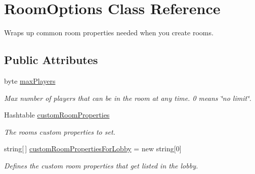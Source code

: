 \hypertarget{class_room_options}{}\section{Room\+Options Class Reference}
\label{class_room_options}


Wraps up common room properties needed when you create rooms.  


\subsection*{Public Attributes}
\begin{DoxyCompactItemize}
\item 
byte \hyperlink{class_room_options_aa6e8ee62ea58621a6ac3dc33deb319ba}{max\+Players}
\begin{DoxyCompactList}\small\item\em Max number of players that can be in the room at any time. 0 means \char`\"{}no limit\char`\"{}.\end{DoxyCompactList}\item 
Hashtable \hyperlink{class_room_options_a0bc17f8465ed615ce0126674af329a1f}{custom\+Room\+Properties}
\begin{DoxyCompactList}\small\item\em The room\textquotesingle{}s custom properties to set. \end{DoxyCompactList}\item 
string\mbox{[}$\,$\mbox{]} \hyperlink{class_room_options_a8c4bca19c674840296f924ec701b9ee1}{custom\+Room\+Properties\+For\+Lobby} = new string\mbox{[}0\mbox{]}
\begin{DoxyCompactList}\small\item\em Defines the custom room properties that get listed in the lobby. \end{DoxyCompactList}\end{DoxyCompactItemize}

